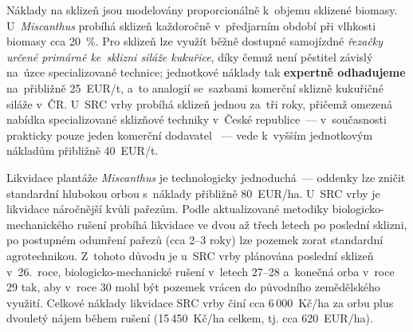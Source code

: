 Náklady na sklizeň jsou modelovány proporcionálně k~objemu sklizené
biomasy. U~\textit{Miscanthus} probíhá sklizeň každoročně v~předjarním
období při vlhkosti biomasy cca 20~\%. Pro sklizeň lze využít běžně
dostupné samojízdné \emph{řezačky určené primárně ke~sklizni siláže
kukuřice}, díky čemuž není pěstitel závislý na~úzce specializované
technice; jednotkové náklady tak \textbf{expertně odhadujeme}
na~přibližně 25~EUR/t, a~to analogií se~sazbami komerční
sklizně kukuřičné siláže v~ČR. U~SRC vrby probíhá sklizeň jednou
za~tři roky, přičemž omezená nabídka specializované sklizňové techniky
v~České republice~--- v~současnosti prakticky pouze jeden komerční
dodavatel \citep{VUKOZ2026}~--- vede k~vyšším jednotkovým nákladům
přibližně 40~EUR/t.

Likvidace plantáže \textit{Miscanthus} je technologicky jednoduchá~---
oddenky lze zničit standardní hlubokou orbou s~náklady přibližně
80~EUR/ha. U~SRC vrby je likvidace náročnější kvůli pařezům. Podle
aktualizované metodiky biologicko-mechanického rušení
\citep{VUKOZ2026} probíhá likvidace ve dvou až třech letech
po poslední sklizni, po postupném odumření pařezů (cca 2--3 roky) lze
pozemek zorat standardní agrotechnikou. Z~tohoto důvodu je u~SRC
vrby plánována poslední sklizeň v~26.~roce, biologicko-mechanické
rušení v~letech 27--28 a~konečná orba v~roce 29 tak, aby v~roce 30
mohl být pozemek vrácen do původního zemědělského využití. Celkové
náklady likvidace SRC vrby činí cca 6\,000~Kč/ha za orbu plus dvouletý
nájem během rušení (15\,450~Kč/ha celkem, tj. cca 620~EUR/ha).


